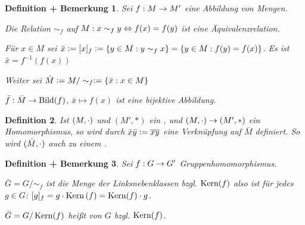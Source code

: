 \documentclass[a4paper,10pt,german]{scrbook}
\theoremstyle{saetze}
\theoremstyle{definitionen}
\newtheorem{Def}{Definition}[section]
\newtheorem{DefBem}[Def]{Definition + Bemerkung}
\begin{document}
\begin{DefBem}
    \label{restklassendefinition}
    Sei $f: M \rightarrow M'$ eine Abbildung von Mengen.
    
    \begin{enum}
        \item Die Relation $\sim_f$ auf $M: x \sim_f y \Leftrightarrow f(x) = f(y)$ ist
        eine Äquivalenzrelation.

        \item Für $x \in M$ sei $\bar x \mathrel{\mathop:}= [x]_f \mathrel{\mathop:}= \{ y \in M : y\sim_f x\} = \{ y\in M: f(y)= f(x)\}$.
	Es ist $\bar x = f^{-1}(f(x))$
	
	Weiter sei $\bar M \mathrel{\mathop:}= M/\sim_f \mathrel{\mathop:}= \{ \bar x : x \in M\}$

	\item $\bar f : \bar M\to \mathop{\rm Bild}\nolimits(f)$, $\bar x\mapsto f(x)$ ist eine bijektive Abbildung.

    \end{enum}
\end{DefBem}

\begin{Def}
        Ist $(M,\cdot)$ und $(M',\ast)$ ein \bla, und $(M,\cdot) \rightarrow (M', \ast)$ ein Homomorphismus, so wird durch
        $\bar x \bar y \mathrel{\mathop:}= \overline{xy}$ eine Verknüpfung auf $\bar M$ 
        definiert. So wird $(\bar M,\cdot)$ auch zu einem \bla.
\end{Def}

\begin{DefBem}
\label{1.14}
    \label{gruppenfaktorgruppe}
    Sei $f:G \rightarrow G'$ Gruppenhomomorphismus.
    
    \begin{enum}
        \item $\bar G = G/\sim_f$ ist
        die Menge der Linksnebenklassen bzgl. $\mathop{\rm Kern}\nolimits(f)$ also ist für jedes $g\in G$: $[g]_f = g\cdot \mathop{\rm Kern}\nolimits{}(f) = \mathop{\rm Kern}\nolimits(f)\cdot g$.

        \item  $\bar G = G/\mathop{\rm Kern}\nolimits(f)$ heißt  von $G$ bzgl.
        $\mathop{\rm Kern}\nolimits(f)$. 
    \end{enum}
\end{DefBem}
\end{document}
